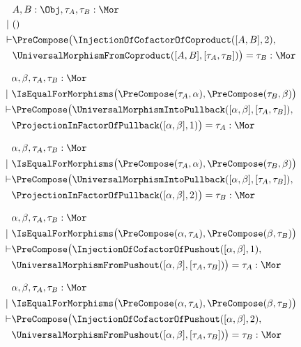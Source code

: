 \begin{sequent}
\begin{align*}
  &A, B:\Obj, \tau_A, \tau_B:\Mor \\
  |~ &()\\
  \vdash &\PreCompose\big(\InjectionOfCofactorOfCoproduct( [A, B], 2 ),\\
  &\UniversalMorphismFromCoproduct( [A,B], [\tau_A, \tau_B] ) \big) = \tau_B:\Mor
\end{align*}
\end{sequent}


\begin{sequent}
\begin{align*}
  &\alpha, \beta, \tau_A, \tau_B:\Mor \\
  |~ &\IsEqualForMorphisms\big( \PreCompose( \tau_A, \alpha ), \PreCompose( \tau_B, \beta ) \big)\\
  \vdash &\PreCompose\big( \UniversalMorphismIntoPullback( [\alpha, \beta], [\tau_A, \tau_B] ), \\
  &\ProjectionInFactorOfPullback( [\alpha, \beta], 1 ) \big) = \tau_A: \Mor
\end{align*}
\end{sequent}

\begin{sequent}
\begin{align*}
  &\alpha, \beta, \tau_A, \tau_B:\Mor \\
  |~ &\IsEqualForMorphisms\big( \PreCompose( \tau_A, \alpha ), \PreCompose( \tau_B, \beta ) \big)\\
  \vdash &\PreCompose\big( \UniversalMorphismIntoPullback( [\alpha, \beta], [\tau_A, \tau_B] ), \\
  &\ProjectionInFactorOfPullback( [\alpha, \beta], 2 ) \big) = \tau_B: \Mor
\end{align*}
\end{sequent}

\begin{sequent}
\begin{align*}
  &\alpha, \beta, \tau_A, \tau_B:\Mor \\
  |~ &\IsEqualForMorphisms\big( \PreCompose( \alpha, \tau_A ), \PreCompose( \beta, \tau_B) \big)\\
  \vdash &\PreCompose\big( \InjectionOfCofactorOfPushout( [\alpha, \beta], 1 ), \\
  &\UniversalMorphismFromPushout( [\alpha, \beta], [\tau_A, \tau_B] )\big) = \tau_A: \Mor
\end{align*}
\end{sequent}

\begin{sequent}
\begin{align*}
  &\alpha, \beta, \tau_A, \tau_B:\Mor \\
  |~ &\IsEqualForMorphisms\big( \PreCompose( \alpha, \tau_A ), \PreCompose( \beta, \tau_B) \big)\\
  \vdash &\PreCompose\big( \InjectionOfCofactorOfPushout( [\alpha, \beta], 2 ), \\
  &\UniversalMorphismFromPushout( [\alpha, \beta], [\tau_A, \tau_B] )\big) = \tau_B: \Mor
\end{align*}
\end{sequent}

